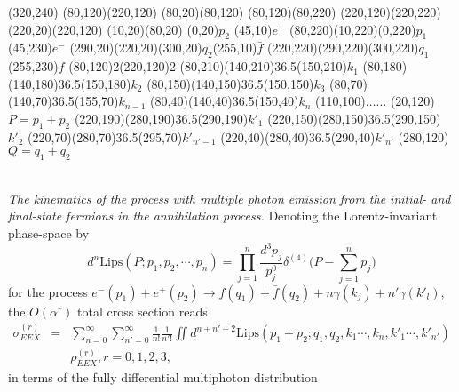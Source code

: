 \begin{axopicture}(320,240) %
	\Line[dash](80,120)(220,120)
	\Line(80,20)(80,120)
	\Line(80,120)(80,220)
	\Line(220,120)(220,220)
	\Line(220,20)(220,120)
	\Line[arrow](10,20)(80,20) \Text(0,20){$p_2$} \Text(45,10){$e^+$}
	\Line[arrow](80,220)(10,220)\Text(0,220){$p_1$}\Text(45,230){$e^-$}
	\Line[arrow](290,20)(220,20)\Text(300,20){$q_2$}\Text(255,10){$\bar{f}$}
	\Line[arrow](220,220)(290,220)\Text(300,220){$q_1$}\Text(255,230){$f$}
	\Vertex(80,120){2}\Vertex(220,120){2}
	\Photon(80,210)(140,210){3}{6.5}\Text(150,210){$k_1$}
	\Photon(80,180)(140,180){3}{6.5}\Text(150,180){$k_2$}
	\Photon(80,150)(140,150){3}{6.5}\Text(150,150){$k_3$}
	\Photon(80,70)(140,70){3}{6.5}\Text(155,70){$k_{n-1}$}
	\Photon(80,40)(140,40){3}{6.5}\Text(150,40){$k_n$}
	\Text(110,100){$\ldots\ldots$}
	\Text(20,120){$P=p_1+p_2$}
	\Photon(220,190)(280,190){3}{6.5}\Text(290,190){$k'_1$}
	\Photon(220,150)(280,150){3}{6.5}\Text(290,150){$k'_2$}
	\Photon(220,70)(280,70){3}{6.5}\Text(295,70){$k'_{n'-1}$}
	\Photon(220,40)(280,40){3}{6.5}\Text(290,40){$k'_{n'}$}
	\Text(280,120){$Q=q_1+q_2$}
\end{axopicture}
\\ {\sl The kinematics of the process with multiple photon emission from the initial- and final-state fermions in the annihilation process.}
\newline\newline
Denoting the Lorentz-invariant phase-space by
\begin{equation}
d^n \text{Lips}(P;p_1,p_2,\cdots,p_n) = \prod_{j=1}^n \frac{d^3 p_j}{p_j^0} \delta^{(4)}\big( P-\sum_{j=1}^n p_j \big)
\end{equation}
for the process $e^-(p_1)+e^+(p_2)\to f(q_1)+\bar{f}(q_2)+n\gamma(k_j)+n'\gamma(k'_l)$, the $O(\alpha^r)$ total cross section reads
\begin{eqnarray}
\sigma^{(r)}_{EEX} &=& \sum_{n=0}^{\infty} \sum_{n'=0}^{\infty}\frac{1}{n!}\frac{1}{n'!}\iint d^{n+n'+2} \text{Lips}(p_1+ p_2;q_1,q_2,k_1\cdots,k_n,k'_1\cdots,k'_{n'})\nonumber\\
&&\rho_{EEX}^{(r)}, r=0,1,2,3,
\end{eqnarray}
in terms of the fully differential multiphoton distribution
